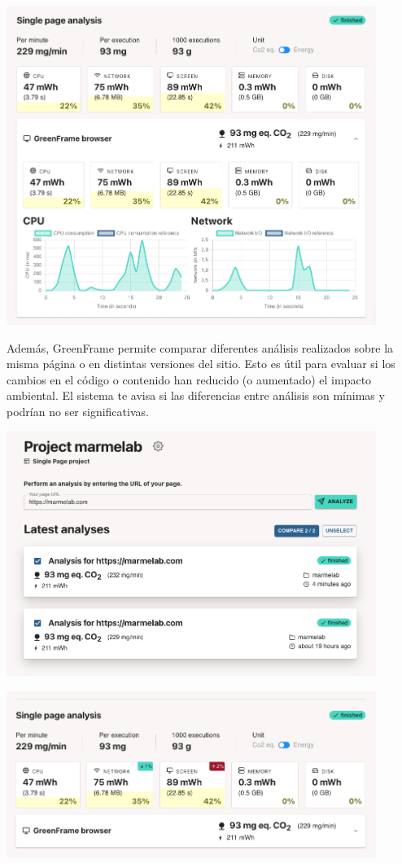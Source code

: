 \documentclass[12pt,a4paper]{report}
\begin{document}
\begin{center}
    \includegraphics[width=0.9\textwidth]{imagenes/Greenframe_6.png}
\end{center}

Además, GreenFrame permite comparar diferentes análisis realizados sobre la misma página o en distintas versiones del sitio. Esto es útil para evaluar si los cambios en el código o contenido han reducido (o aumentado) el impacto ambiental. El sistema te avisa si las diferencias entre análisis son mínimas y podrían no ser significativas.

\begin{center}
    \includegraphics[width=0.9\textwidth]{imagenes/Greenframe_7.png}
\end{center}

\begin{center}
    \includegraphics[width=0.9\textwidth]{imagenes/Greenframe_8.png}
\end{center}
\end{document}
